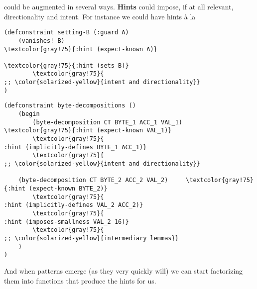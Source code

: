 \corset{} could be augmented in several ways. \textbf{Hints} could impose, if at all relevant, directionality and intent. For instance we could have hints à la
\begin{Verbatim}[commandchars=\\\{\}]
(defconstraint setting-B (:guard A)            
    (vanishes! B)                                      \textcolor{gray!75}{:hint (expect-known A)}
                                                       \textcolor{gray!75}{:hint (sets B)}
        \textcolor{gray!75}{                                               ;; \color{solarized-yellow}{intent and directionality}}
)
\end{Verbatim}

\begin{Verbatim}[commandchars=\\\{\}]
(defconstraint byte-decompositions ()
    (begin
        (byte-decomposition CT BYTE_1 ACC_1 VAL_1)     \textcolor{gray!75}{:hint (expect-known VAL_1)}
        \textcolor{gray!75}{                                               :hint (implicitly-defines BYTE_1 ACC_1)}
        \textcolor{gray!75}{                                               ;; \color{solarized-yellow}{intent and directionality}}

	(byte-decomposition CT BYTE_2 ACC_2 VAL_2)     \textcolor{gray!75}{:hint (expect-known BYTE_2)}
        \textcolor{gray!75}{                                               :hint (implicitly-defines VAL_2 ACC_2)}
        \textcolor{gray!75}{                                               :hint (imposes-smallness VAL_2 16)}
        \textcolor{gray!75}{                                               ;; \color{solarized-yellow}{intermediary lemmas}}
	)
)
\end{Verbatim}
And when patterns emerge (as they very quickly will) we can start factorizing them into \corset{} functions that produce the hints for us. 

